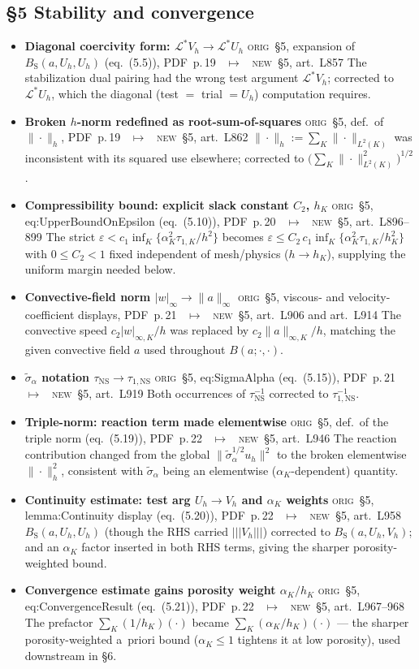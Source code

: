 \documentclass[11pt]{article}
\newcommand{\Orig}{\textcolor{origc}{\footnotesize\textsc{orig}}}
\newcommand{\New}{\textcolor{newc}{\footnotesize\textsc{new}}}
\newcommand{\code}[1]{\textcolor{newc}{\ttfamily\small #1}}
\newcommand{\pdfp}[1]{PDF~p.\,#1}
\newcommand{\artl}[1]{art.\ L#1}       %
\newcommand{\ch}[4]{%
  \item \textbf{#1}\newline
    {\footnotesize\Orig\ #2 \ \textcolor{locc}{$\longmapsto$} \ \New\ #3}\newline
    #4}
\begin{document}
\subsection{\S5 Stability and convergence}
\begin{itemize}
\ch{Diagonal coercivity form: $\mathcal L^*V_h \to \mathcal L^*U_h$}
   {\S5, expansion of $B_{\mathrm S}(a,U_h,U_h)$ (eq.~(5.5)), \pdfp{19}}
   {\S5, \artl{857}}
   {The stabilization dual pairing had the wrong test argument $\mathcal L^*V_h$; corrected to
    $\mathcal L^*U_h$, which the diagonal (test $=$ trial $=U_h$) computation requires.}
\ch{Broken $h$-norm redefined as root-sum-of-squares}
   {\S5, def.\ of $\|\cdot\|_h$, \pdfp{19}}
   {\S5, \artl{862}}
   {$\|\cdot\|_h:=\sum_K\|\cdot\|_{L^2(K)}$ was inconsistent with its squared use elsewhere;
    corrected to $\big(\sum_K\|\cdot\|_{L^2(K)}^2\big)^{1/2}$.}
\ch{Compressibility bound: explicit slack constant $C_2$, $h_K$}
   {\S5, \code{eq:UpperBoundOnEpsilon} (eq.~(5.10)), \pdfp{20}}
   {\S5, \artl{896}--899}
   {The strict $\varepsilon<c_1\inf_K\{\alpha_K^2\tau_{1,K}/h^2\}$ becomes
    $\varepsilon\le C_2\,c_1\inf_K\{\alpha_K^2\tau_{1,K}/h_K^2\}$ with $0\le C_2<1$ fixed independent
    of mesh/physics ($h\to h_K$), supplying the uniform margin needed below.}
\ch{Convective-field norm $|w|_\infty \to \|a\|_\infty$}
   {\S5, viscous- and velocity-coefficient displays, \pdfp{21}}
   {\S5, \artl{906} and \artl{914}}
   {The convective speed $c_2|w|_{\infty,K}/h$ was replaced by $c_2\|a\|_{\infty,K}/h$, matching the
    given convective field $a$ used throughout $B(a;\cdot,\cdot)$.}
\ch{$\tilde\sigma_\alpha$ notation $\tau_{\mathrm{NS}}\to\tau_{1,\mathrm{NS}}$}
   {\S5, \code{eq:SigmaAlpha} (eq.~(5.15)), \pdfp{21}}
   {\S5, \artl{919}}
   {Both occurrences of $\tau_{\mathrm{NS}}^{-1}$ corrected to $\tau_{1,\mathrm{NS}}^{-1}$.}
\ch{Triple-norm: reaction term made elementwise}
   {\S5, def.\ of the triple norm (eq.~(5.19)), \pdfp{22}}
   {\S5, \artl{946}}
   {The reaction contribution changed from the global
    $\|\tilde\sigma_\alpha^{1/2}u_h\|^2$ to the broken elementwise $\|\cdot\|_h^2$, consistent with
    $\tilde\sigma_\alpha$ being an elementwise ($\alpha_K$-dependent) quantity.}
\ch{Continuity estimate: test arg $U_h\to V_h$ and $\alpha_K$ weights}
   {\S5, \code{lemma:Continuity} display (eq.~(5.20)), \pdfp{22}}
   {\S5, \artl{958}}
   {$B_{\mathrm S}(a,U_h,U_h)$ (though the RHS carried $|\!|\!|V_h|\!|\!|$) corrected to
    $B_{\mathrm S}(a,U_h,V_h)$; and an $\alpha_K$ factor inserted in both RHS terms, giving the sharper
    porosity-weighted bound.}
\ch{Convergence estimate gains porosity weight $\alpha_K/h_K$}
   {\S5, \code{eq:ConvergenceResult} (eq.~(5.21)), \pdfp{22}}
   {\S5, \artl{967}--968}
   {The prefactor $\sum_K(1/h_K)(\cdot)$ became $\sum_K(\alpha_K/h_K)(\cdot)$ --- the sharper
    porosity-weighted a~priori bound ($\alpha_K\le1$ tightens it at low porosity), used downstream in
    \S6.}
\end{itemize}
\end{document}

